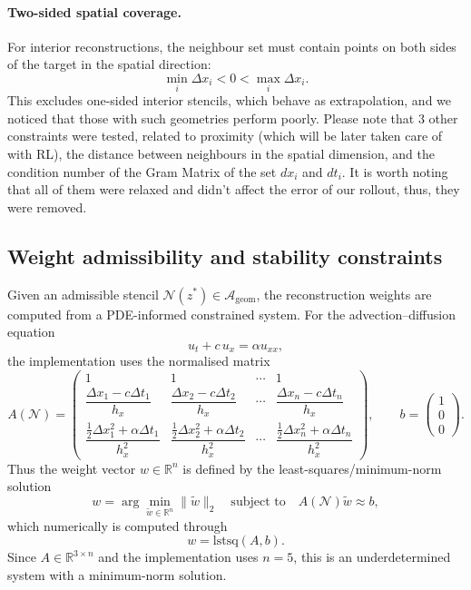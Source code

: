 \documentclass[12pt, a4paper, twoside]{report}
\theoremstyle{plain}
\theoremstyle{definition}
\begin{document}
\paragraph{Two-sided spatial coverage.}
For interior reconstructions, the neighbour set must contain points on both sides of the target in the spatial direction:
\[
\min_i \Delta x_i < 0 < \max_i \Delta x_i.
\] 
This excludes one-sided interior stencils, which behave as extrapolation, and we noticed that those with such geometries perform poorly. Please note that 3 other constraints were tested, related to proximity (which will be later taken care of with RL), the distance between neighbours in the spatial dimension, and the condition number of the Gram Matrix of the set $dx_i$ and $dt_i$. It is worth noting that all of them were relaxed and didn't affect the error of our rollout, thus, they were removed. 

\subsection{Weight admissibility and stability constraints}

Given an admissible stencil $\mathcal N(z^*) \in \mathcal A_{\mathrm{geom}}$, the reconstruction weights are computed from a PDE-informed constrained system. For the advection--diffusion equation
\begin{equation}
    u_t + c\,u_x = \alpha u_{xx}, \label{diff_advection}
\end{equation}
the implementation uses the normalised matrix
\[
A(\mathcal N) =
\begin{pmatrix}
1 & 1 & \cdots & 1 \\
\dfrac{\Delta x_1 - c\Delta t_1}{h_x} &
\dfrac{\Delta x_2 - c\Delta t_2}{h_x} &
\cdots &
\dfrac{\Delta x_n - c\Delta t_n}{h_x} \\
\dfrac{\frac12\Delta x_1^2 + \alpha \Delta t_1}{h_x^2} &
\dfrac{\frac12\Delta x_2^2 + \alpha \Delta t_2}{h_x^2} &
\cdots &
\dfrac{\frac12\Delta x_n^2 + \alpha \Delta t_n}{h_x^2} \label{A_matrix}
\end{pmatrix},
\qquad
b=
\begin{pmatrix}
1\\0\\0
\end{pmatrix}.
\]
Thus the weight vector $w\in\mathbb R^n$ is defined by the least-squares/minimum-norm solution
\[
w = \arg\min_{\tilde w \in \mathbb R^n}\|\tilde w\|_2
\quad
\text{subject to}
\quad
A(\mathcal N)\tilde w \approx b,
\]
which numerically is computed through
\[
w = \mathrm{lstsq}(A,b).
\]
Since $A\in\mathbb R^{3\times n}$ and the implementation uses $n=5$, this is an underdetermined system with a minimum-norm solution.
\end{document}
